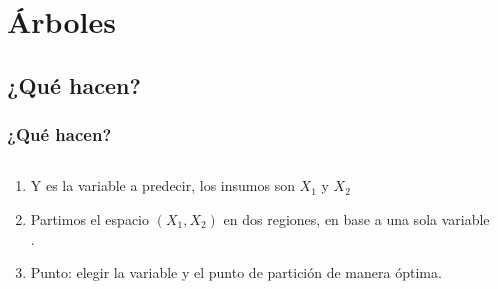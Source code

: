 \documentclass[
  shownotes,
  xcolor={svgnames},
  hyperref={colorlinks,citecolor=DarkBlue,linkcolor=andesred,urlcolor=DarkBlue}
  , aspectratio=169]{beamer}
\begin{document}
\section{Árboles}
\subsection{¿Qué hacen?}
\begin{frame}[fragile]
\frametitle{¿Qué hacen?}


\begin{columns}[T] %
\begin{column}{.48\textwidth}
  
\begin{enumerate}
    \footnotesize
\item Y es la variable a predecir, los insumos son $X_1$ y $X_2$
\medskip
\item  Partimos el espacio $(X_1,X_2)$ en dos regiones, en base a una sola variable .
\medskip
\item Punto: elegir la variable y el punto de partición de manera óptima.
\end{enumerate}


\end{column}  
\hfill
\begin{column}{.52\textwidth}

\end{column}
\end{columns}

\end{frame}
\end{document}
